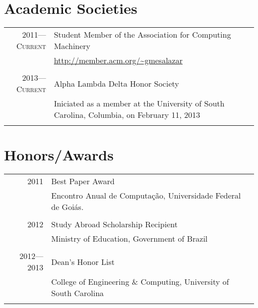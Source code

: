 \documentclass[a4paper,10pt]{article}
\begin{document}
\section{Academic Societies}

\begin{tabular}{r|p{11cm}}
  \textsc{2011---Current}
  & Student Member of the Association for Computing Machinery\\
  & \footnotesize{\url{http://member.acm.org/~gmesalazar}}
  \\\multicolumn{2}{c}{}\\

  \textsc{2013---Current}
  & Alpha Lambda Delta Honor Society\\
  & \footnotesize{Iniciated as a member at the University of South Carolina, Columbia, on February 11, 2013}\\
  \multicolumn{2}{c}{}\\
  
\end{tabular}

\section{Honors/Awards}
\begin{tabular}{r|p{11cm}}
  \textsc{2011}
  & Best Paper Award\\
  & Encontro Anual de Computação, Universidade Federal de Goiás.\\
  \multicolumn{2}{c}{}\\

  \textsc{2012}
  & Study Abroad Scholarship Recipient\\
  & Ministry of Education, Government of Brazil\\
  \multicolumn{2}{c}{}\\

  \textsc{2012---2013}
  & Dean's Honor List\\
  & College of Engineering \& Computing, University of South Carolina\\
  \multicolumn{2}{c}{}\\
\end{tabular}
\end{document}
